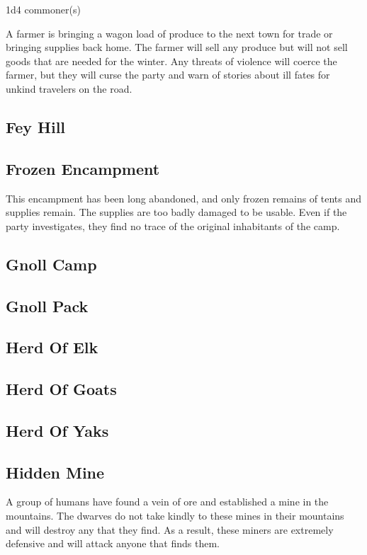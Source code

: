 1d4 commoner(s)

A farmer is bringing a wagon load of produce to the next town for trade or bringing supplies back home.
The farmer will sell any produce but will not sell goods that are needed for the winter.
Any threats of violence will coerce the farmer, but they will curse the party and warn of stories about ill fates for unkind travelers on the road.

\subsection{Fey Hill}

\subsection{Frozen Encampment}

This encampment has been long abandoned, and only frozen remains of tents and supplies remain.
The supplies are too badly damaged to be usable.
Even if the party investigates, they find no trace of the original inhabitants of the camp.

\subsection{Gnoll Camp}

\subsection{Gnoll Pack}

\subsection{Herd Of Elk}

\subsection{Herd Of Goats}

\subsection{Herd Of Yaks}

\subsection{Hidden Mine}

A group of humans have found a vein of ore and established a mine in the mountains.
The dwarves do not take kindly to these mines in their mountains and will destroy any that they find.
As a result, these miners are extremely defensive and will attack anyone that finds them.

